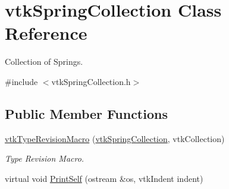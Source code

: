 \hypertarget{classvtkSpringCollection}{
\section{vtkSpringCollection Class Reference}
\label{classvtkSpringCollection}
}


Collection of Springs.  




{\ttfamily \#include $<$vtkSpringCollection.h$>$}

\subsection*{Public Member Functions}
\begin{DoxyCompactItemize}
\item 
\hypertarget{classvtkSpringCollection_a18851eaafe4832dd0d88a5986b515721}{
\hyperlink{classvtkSpringCollection_a18851eaafe4832dd0d88a5986b515721}{vtkTypeRevisionMacro} (\hyperlink{classvtkSpringCollection}{vtkSpringCollection}, vtkCollection)}
\label{classvtkSpringCollection_a18851eaafe4832dd0d88a5986b515721}

\begin{DoxyCompactList}\small\item\em Type Revision Macro. \item\end{DoxyCompactList}\item 
\hypertarget{classvtkSpringCollection_ab049018e5e2df11cc5faeed8361d96ec}{
virtual void \hyperlink{classvtkSpringCollection_ab049018e5e2df11cc5faeed8361d96ec}{PrintSelf} (ostream \&os, vtkIndent indent)}
\label{classvtkSpringCollection_ab049018e5e2df11cc5faeed8361d96ec}


\end{DoxyCompactItemize}
